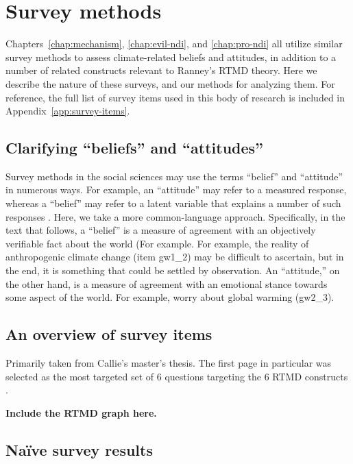 \chapter{Survey methods}
\label{chap:attitudes}

Chapters~\ref{chap:mechanism}, \ref{chap:evil-ndi}, and \ref{chap:pro-ndi} all
utilize similar survey methods to assess climate-related beliefs and attitudes,
in addition to a number of related constructs relevant to Ranney's
\citeyear{ranney-rtmd} RTMD theory. Here we describe the nature of these
surveys, and our methods for analyzing them. For reference, the full list of
survey items used in this body of research is included in
Appendix~\ref{app:survey-items}.

\section{Clarifying \texorpdfstring{“beliefs”}{"beliefs"} and
    \texorpdfstring{“attitudes”}{"attitudes"}}

Survey methods in the social sciences may use the terms “belief” and “attitude”
in numerous ways. For example, an “attitude” may refer to a measured response,
whereas a “belief” may refer to a latent variable that explains a number of such
responses \cite{some-attitude-latent-var-ref}. Here, we take a more
common-language approach. Specifically, in the text that follows, a “belief” is
a measure of agreement with an objectively verifiable fact about the world (For
example. For example, the reality of anthropogenic climate change (item gw1_2)
may be difficult to ascertain, but in the end, it is something that could be
settled by observation. An “attitude,” on the other hand, is a measure of
agreement with an emotional stance towards some aspect of the world. For
example, worry about global warming (gw2_3).

\section{An overview of survey items}

Primarily taken from Callie’s master’s thesis. The first page in particular was
selected as the most targeted set of 6 questions targeting the 6 RTMD
constructs \cite{ranney-rtmd}.

\textbf{Include the RTMD graph here.}

\section{Na\"ive survey results}

